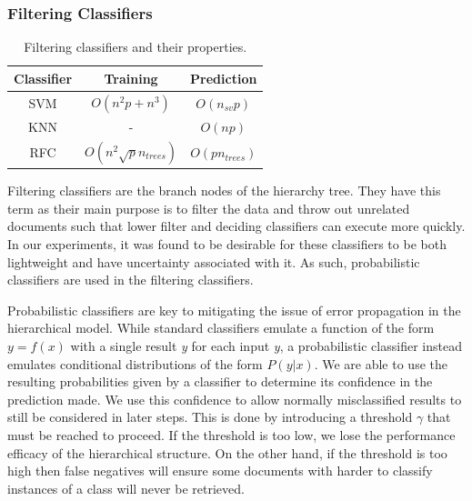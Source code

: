 \subsubsection{Filtering Classifiers}

\begin{table}[h]
    \begin{tabular}{c|cc}
        Classifier & Training & Prediction \\ \hline
        SVM & $O(n^2p+n^3)$ & $O(n_{sv}p)$ \\
        KNN & - & $O(np)$ \\
        RFC & $O(n^2\sqrt{p}n_{trees})$ & $O(pn_{trees})$
    \end{tabular}
\caption{Filtering classifiers and their properties.}
\label{tab:filt-class}
\end{table}

Filtering classifiers are the branch nodes of the hierarchy tree. They have this term as their main purpose is to filter the data and throw out unrelated documents such that lower filter and deciding classifiers can execute more quickly. In our experiments, it was found to be desirable for these classifiers to be both lightweight and have uncertainty associated with it. As such, probabilistic classifiers are used in the filtering classifiers. 

Probabilistic classifiers are key to mitigating the issue of error propagation in the hierarchical model. While standard classifiers emulate a function of the form $y=f(x)$ with a single result \textit{y} for each input \textit{y}, a probabilistic classifier instead emulates conditional distributions of the form $P(y|x)$. We are able to use the resulting probabilities given by a classifier to determine its confidence in the prediction made. We use this confidence to allow normally misclassified results to still be considered in later steps. This is done by introducing a threshold $\gamma$ that must be reached to proceed. If the threshold is too low, we lose the performance efficacy of the hierarchical structure. On the other hand, if the threshold is too high then false negatives will ensure some documents with harder to classify instances of a class will never be retrieved.

